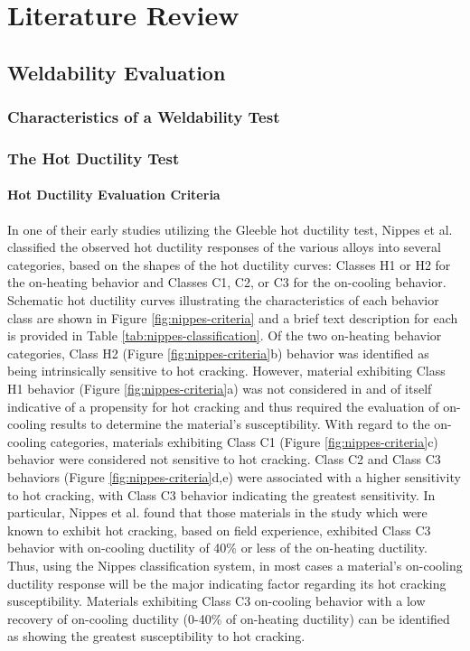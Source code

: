 \chapter{Literature Review} \label{ch:literature-review}

\section{Weldability Evaluation} \label{sec:weldability-evaluation}

\subsection{Characteristics of a Weldability Test}

\subsection{The Hot Ductility Test}

\subsubsection{Hot Ductility Evaluation Criteria}
In one of their early studies utilizing the Gleeble hot ductility test, Nippes et al. \cite{nippes_further_1957} classified the observed hot ductility responses of the various alloys into several categories, based on the shapes of the hot ductility curves: Classes H1 or H2 for the on-heating behavior and Classes C1, C2, or C3 for the on-cooling behavior. Schematic hot ductility curves illustrating the characteristics of each behavior class are shown in Figure \ref{fig:nippes-criteria} and a brief text description for each is provided in Table \ref{tab:nippes-classification}. Of the two on-heating behavior categories, Class H2 (Figure \ref{fig:nippes-criteria}b) behavior was identified as being intrinsically sensitive to hot cracking. However, material exhibiting Class H1 behavior (Figure \ref{fig:nippes-criteria}a) was not considered in and of itself indicative of a propensity for hot cracking and thus required the evaluation of on-cooling results to determine the material's susceptibility. With regard to the on-cooling categories, materials exhibiting Class C1 (Figure \ref{fig:nippes-criteria}c) behavior were considered not sensitive to hot cracking. Class C2 and Class C3 behaviors (Figure \ref{fig:nippes-criteria}d,e) were associated with a higher sensitivity to hot cracking, with Class C3 behavior indicating the greatest sensitivity. In particular, Nippes et al. found that those materials in the study which were known to exhibit hot cracking, based on field experience, exhibited Class C3 behavior with on-cooling ductility of 40\% or less of the on-heating ductility. Thus, using the Nippes classification system, in most cases a material's on-cooling ductility response will be the major indicating factor regarding its hot cracking susceptibility. Materials exhibiting Class C3 on-cooling behavior with a low recovery of on-cooling ductility (0-40\% of on-heating ductility) can be identified as showing the greatest susceptibility to hot cracking.

